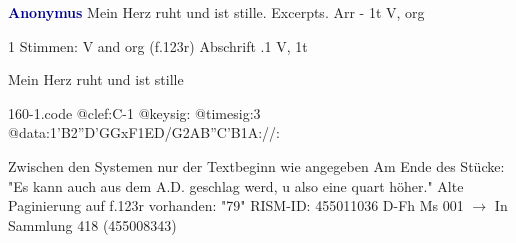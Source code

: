 \documentclass[twocolumn]{book}
\begin{document}
\newline \par \vspace{7pt} \textcolor{darkblue}{\textbf{Anonymus  }}
\newline Mein Herz ruht und ist stille. Excerpts. Arr - 1t
\newline V, org
\newline \begin{itshape}\end{itshape} 
\newline \textcolor{darkblue}{}  1 Stimmen: V and org  (f.123r)
\newline Abschrift
.1  V, 1t
\newline \begin{footnotesize} Mein Herz ruht und ist stille \end{footnotesize}  
\begin{filecontents*}{160-1.code}
@clef:C-1
@keysig:
@timesig:3
@data:1'B2''D'GGxF1ED/G2AB''C'B1A://:
\end{filecontents*}
\newline
%
\newline Zwischen den Systemen nur der Textbeginn wie angegeben
\newline Am Ende des Stücke: "Es kann auch aus dem A.D. geschlag werd, u also eine quart höher."
\newline Alte Paginierung auf f.123r vorhanden: "79"
\newline RISM-ID: 455011036
\newline D-Fh  Ms 001
\newline $\rightarrow$ In Sammlung 418 (455008343)
      
\end{document}
